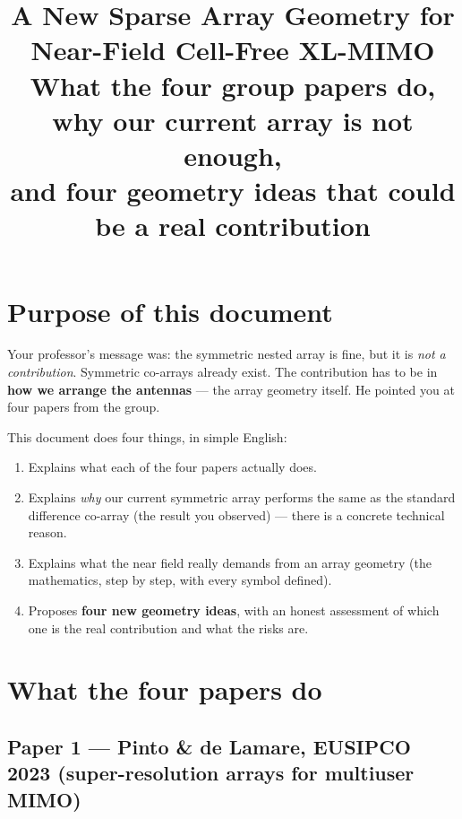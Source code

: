 \documentclass[11pt]{article}
\title{\vspace{-2.4em}\textbf{A New Sparse Array Geometry for\\ Near-Field Cell-Free XL-MIMO}\\[0.3em]
\large What the four group papers do, why our current array is not enough,\\ and four geometry ideas that could be a real contribution}
\author{}
\date{}
\begin{document}
\maketitle
\vspace{-3em}

\section{Purpose of this document}

Your professor's message was: the symmetric nested array is fine, but it is \emph{not a
contribution}. Symmetric co-arrays already exist. The contribution has to be in \textbf{how we
arrange the antennas} --- the array geometry itself. He pointed you at four papers from the group.

This document does four things, in simple English:
\begin{enumerate}
\item Explains what each of the four papers actually does.
\item Explains \emph{why} our current symmetric array performs the same as the standard difference
co-array (the result you observed) --- there is a concrete technical reason.
\item Explains what the near field really demands from an array geometry (the mathematics, step by
step, with every symbol defined).
\item Proposes \textbf{four new geometry ideas}, with an honest assessment of which one is the real
contribution and what the risks are.
\end{enumerate}

\section{What the four papers do}

\subsection{Paper 1 --- Pinto \& de Lamare, EUSIPCO 2023 (super-resolution arrays for multiuser MIMO)}
\end{document}
